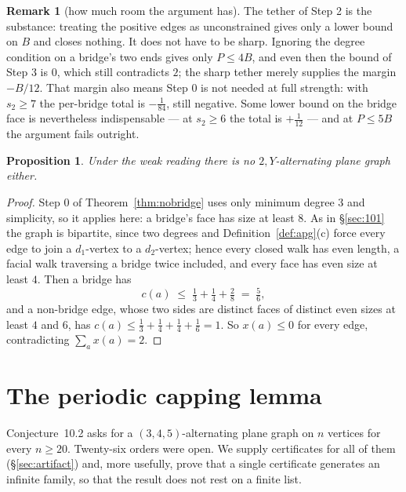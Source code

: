 \documentclass[11pt,a4paper]{amsart}
\theoremstyle{plain}
\newtheorem{proposition}[theorem]{Proposition}
\theoremstyle{definition}
\newtheorem{remark}[theorem]{Remark}
\begin{document}
\begin{remark}[how much room the argument has]
The tether of Step 2 is the substance: treating the positive edges as
unconstrained gives only a lower bound on $B$ and closes nothing. It does not
have to be sharp. Ignoring the degree condition on a bridge's two ends gives
only $P \le 4B$, and even then the bound of Step 3 is $0$, which still
contradicts $2$; the sharp tether merely supplies the margin $-B/12$. That
margin also means Step 0 is not needed at full strength: with $s_2 \ge 7$ the
per-bridge total is $-\tfrac1{84}$, still negative. Some lower bound on the
bridge face is nevertheless indispensable --- at $s_2 \ge 6$ the total is
$+\tfrac1{12}$ --- and at $P \le 5B$ the argument fails outright.
\end{remark}

\begin{proposition}\label{prop:twoY-weak}
Under the weak reading there is no $2,Y$-alternating plane graph either.
\end{proposition}

\begin{proof}
Step 0 of Theorem~\ref{thm:nobridge} uses only minimum degree $3$ and
simplicity, so it applies here: a bridge's face has size at least $8$. As in
\S\ref{sec:101} the graph is bipartite, since two degrees and
Definition~\ref{def:apg}(c) force every edge to join a $d_1$-vertex to a
$d_2$-vertex; hence every closed walk has even length, a facial walk traversing
a bridge twice included, and every face has even size at least $4$. Then a
bridge has
\[
  c(a) \;\le\; \tfrac13 + \tfrac14 + \tfrac28 \;=\; \tfrac56 ,
\]
and a non-bridge edge, whose two sides are distinct faces of distinct even sizes
at least $4$ and $6$, has
$c(a) \le \tfrac13+\tfrac14+\tfrac14+\tfrac16 = 1$. So $x(a) \le 0$ for every
edge, contradicting $\sum_a x(a) = 2$.
\end{proof}

\section{The periodic capping lemma}\label{sec:pumping}

Conjecture~10.2 asks for a $(3,4,5)$-alternating plane graph on $n$ vertices for
every $n \ge 20$. Twenty-six orders were open. We supply certificates for all of
them (\S\ref{sec:artifact}) and, more usefully, prove that a single certificate
generates an infinite family, so that the result does not rest on a finite list.
\end{document}

